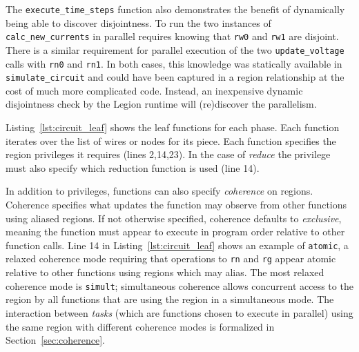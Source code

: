 The {\tt execute\_time\_steps} function also demonstrates the benefit of dynamically
being able to discover disjointness.  To run the two instances of 
{\tt calc\_new\_currents} in parallel requires knowing that {\tt rw0}
and {\tt rw1} are disjoint.  There is a similar requirement for parallel
execution of the two {\tt update\_voltage} calls with {\tt rn0} and {\tt rn1}.  In
both cases, this knowledge was statically available in {\tt simulate\_circuit}
and could have been captured in a region relationship at the cost
of much more complicated code.  Instead, an inexpensive dynamic disjointness
check by the Legion runtime will (re)discover the parallelism.

Listing~\ref{lst:circuit_leaf} shows the leaf functions for each phase.
Each function iterates over the list of wires or
nodes for its piece.  Each function specifies the region privileges it
requires (lines 2,14,23).  
In the case of {\em reduce} the
privilege must also specify which reduction function is used
(line 14).

In addition to privileges, functions can also specify {\em coherence}
on regions.  Coherence specifies what updates the function may
observe from other functions using aliased regions.  
If not otherwise specified, coherence defaults to {\em exclusive}, 
meaning the function must appear to execute in program order relative to
other function calls.  
Line 14 in Listing~\ref{lst:circuit_leaf} shows
an example of {\tt atomic}, a relaxed coherence mode requiring
that operations to {\tt rn} and {\tt rg} appear atomic relative
to other functions using regions which may alias.  The most relaxed coherence
mode is {\tt simult}; simultaneous coherence allows concurrent access 
to the region by all functions that are using the region
in a simultaneous mode.  The interaction between {\em tasks} (which are functions chosen to execute in parallel) using the same
region with different coherence
modes is formalized in Section~\ref{sec:coherence}.

